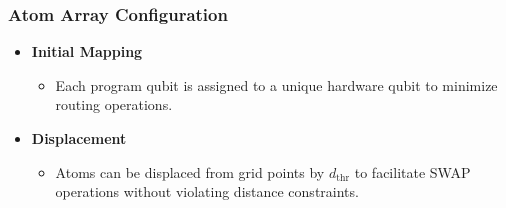 \documentclass[18 pt]{beamer}
\begin{document}
\begin{frame}
    \frametitle{Atom Array Configuration}
    \begin{itemize}
        \item \textbf{Initial Mapping}
        \begin{itemize}
            \item Each program qubit is assigned to a unique hardware qubit to minimize routing operations.
        \end{itemize}
        \item \textbf{Displacement}
        \begin{itemize}
            \item Atoms can be displaced from grid points by $d_{\text{thr}}$ to facilitate SWAP operations without violating distance constraints.
        \end{itemize}
    \end{itemize}
\end{frame}
\end{document}
